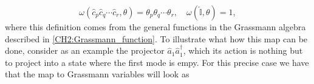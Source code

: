 \begin{equation}
\omega\left(\hat{c}_{p} \hat{c}_{q} \cdots \hat{c}_{r}, \theta\right)=\theta_{p} \theta_{q} \cdots \theta_{r}, \quad \omega(\hat{\mathbb{I}}, \theta)=1,
\label{CH2:Gaussian_majorana_map_majorana}
\end{equation}
where this definition comes from the general functions in the Grassmann algebra described in \eqref{CH2:Grassmann_function}.
\newline
To illustrate what how this map can be done, consider as an example the projector $\hat{a}_1\hat{a}_1^{\dagger}$, which its action is nothing but to project into a state where the first mode is empy. For this precise case we have that the map to Grassmann variables will look as

